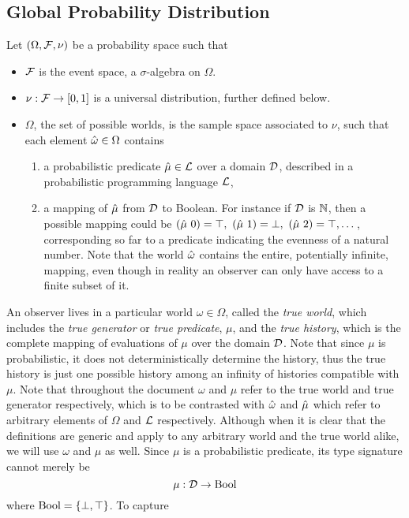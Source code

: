 \documentclass[]{article}
\begin{document}
\subsection{Global Probability Distribution}
\label{sec:globalprob}
Let $(\Omega, \mathcal{F}, \nu)$ be a probability space such that
\begin{itemize}
\item $\mathcal{F}$ is the event space, a $\sigma$-algebra on $\Omega$.
\item $\nu : \mathcal{F} \to [0, 1]$ is a universal distribution, further
  defined below.
\item $\Omega$, the set of possible worlds, is the sample space
  associated to $\nu$, such that each element $\hat{\omega} \in \Omega$
  contains
  \begin{enumerate}
  \item a probabilistic predicate $\hat{\mu} \in \mathcal{L}$ over a domain
    $\mathcal{D}$, described in a probabilistic programming language
    $\mathcal{L}$,
  \item a mapping of $\hat{\mu}$ from $\mathcal{D}$ to Boolean.  For instance
    if $\mathcal{D}$ is $\mathbb{N}$, then a possible mapping could be
    $(\anymu\ 0) = \T,\ (\anymu\ 1) = \F, \ (\anymu\ 2) = \T, \dots$,
    corresponding so far to a predicate indicating the evenness of a
    natural number.  Note that the world $\hat{\omega}$ contains
    the entire, potentially infinite, mapping, even though in reality
    an observer can only have access to a finite subset of it.
  \end{enumerate}
\end{itemize}
An observer lives in a particular world $\omega \in \Omega$, called
the \emph{true world}, which includes the \emph{true generator} or
\emph{true predicate}, $\mu$, and the \emph{true history}, which is
the complete mapping of evaluations of $\mu$ over the domain
$\mathcal{D}$.  Note that since $\mu$ is probabilistic, it does not
deterministically determine the history, thus the true history is just
one possible history among an infinity of histories compatible with
$\mu$.  Note that throughout the document $\omega$ and $\mu$ refer to
the true world and true generator respectively, which is to be
contrasted with $\hat{\omega}$ and $\hat{\mu}$ which refer to arbitrary
elements of $\Omega$ and $\mathcal{L}$ respectively.  Although when it
is clear that the definitions are generic and apply to any arbitrary
world and the true world alike, we will use $\omega$ and $\mu$ as
well.  Since $\mu$ is a probabilistic predicate, its type signature
cannot merely be
$$\mu : \mathcal{D} \to \textup{Bool}$$ where $\textup{Bool} = \{\bot, \top\}$.  To capture
\end{document}
